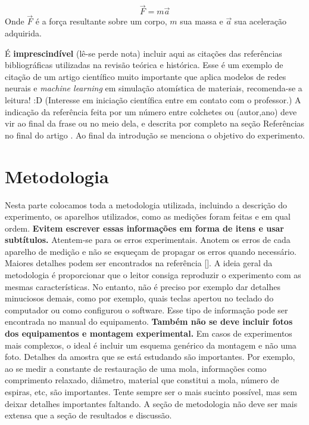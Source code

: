\documentclass[reprint,amsmath,amssymb,aps,prl,floatfix,onecolumn]{revtex4-2}
\begin{document}
\begin{equation}
	\label{eq1}
	\vec{F}=m\vec{a}
\end{equation}
Onde $\vec{F}$ é a força resultante sobre um corpo, $m$ sua massa e $\vec{a}$ sua aceleração adquirida.
\vspace{12pt}


É \textbf{imprescindível} (lê-se perde nota) incluir aqui as citações das referências bibliográficas utilizadas na revisão teórica e histórica. Esse é um exemplo de citação de um artigo científico muito importante\cite{Matusalem2022} que aplica modelos de redes neurais e \textit{machine learning} em simulação atomística de materiais, recomenda-se a leitura! :D (Interesse em iniciação científica entre em contato com o professor.) A indicação da referência feita por um número entre colchetes ou (autor,ano) deve vir ao final da frase ou no meio dela, e descrita por completo na seção Referências no final do artigo . Ao final da introdução se menciona o objetivo do experimento.


\section{Metodologia}

Nesta parte colocamos toda a metodologia utilizada, incluindo a descrição do experimento, os aparelhos utilizados, como as medições foram feitas e em qual ordem. \textbf{Evitem escrever essas informações em forma de itens e usar subtítulos.} Atentem-se para os erros experimentais. Anotem os erros de cada aparelho de medição e não se esqueçam de propagar os erros quando necessário. Maiores detalhes podem ser encontrados na referência []. A ideia geral da metodologia é proporcionar que o leitor consiga reproduzir o experimento com as mesmas características. No entanto, não é preciso por exemplo dar detalhes minuciosos demais, como por exemplo, quais teclas apertou no teclado do computador ou como configurou o software. Esse tipo de informação pode ser encontrada no manual do equipamento.\textbf{ Também não se deve incluir fotos dos equipamentos e montagem experimental.} Em casos de experimentos mais complexos, o ideal é incluir um esquema genérico da montagem e não uma foto. Detalhes da amostra que se está estudando são importantes. Por exemplo, ao se medir a constante de restauração de uma mola, informações como comprimento relaxado, diâmetro, material que constitui a mola, número de espiras, etc, são importantes. Tente sempre ser o mais sucinto possível, mas sem deixar detalhes importantes faltando. A seção de metodologia não deve ser mais extensa que a seção de resultados e discussão.  
\end{document}
